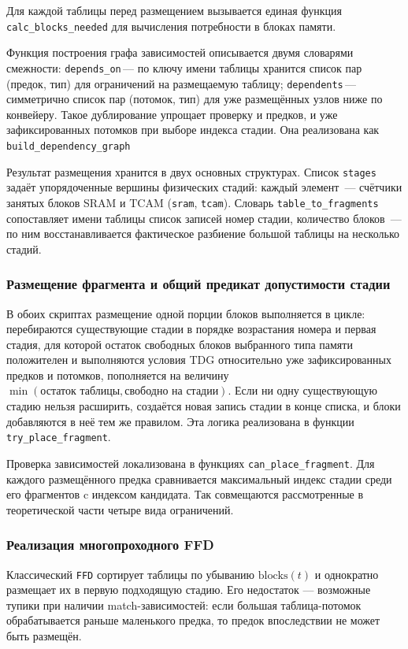 Для каждой таблицы перед размещением вызывается единая функция \texttt{calc\_blocks\_needed} для вычисления потребности в блоках памяти.

Функция построения графа зависимостей описывается двумя словарями смежности: \texttt{depends\_on}\,--- по ключу имени таблицы хранится список пар (предок, тип) для ограничений на размещаемую таблицу; \texttt{dependents}\,--- симметрично список пар (потомок, тип) для уже размещённых узлов ниже по конвейеру. Такое дублирование упрощает проверку и предков, и уже зафиксированных потомков при выборе индекса стадии. Она реализована как \texttt{build\_dependency\_graph}

Результат размещения хранится в двух основных структурах. Список \texttt{stages} задаёт упорядоченные вершины физических стадий: каждый элемент~--- счётчики занятых блоков SRAM и TCAM (\texttt{sram}, \texttt{tcam}). Словарь \texttt{table\_to\_fragments} сопоставляет имени таблицы список записей {номер стадии, количество блоков}~--- по ним восстанавливается фактическое разбиение большой таблицы на несколько стадий.

\subsubsection{Размещение фрагмента и общий предикат допустимости стадии}
В обоих скриптах размещение одной порции блоков выполняется в цикле: перебираются существующие стадии в порядке возрастания номера и первая стадия, для которой остаток свободных блоков выбранного типа памяти положителен и выполняются условия TDG относительно уже зафиксированных предков и потомков, пополняется на величину \(\min(\text{остаток таблицы}, \text{свободно на стадии})\). Если ни одну существующую стадию нельзя расширить, создаётся новая запись стадии в конце списка, и блоки добавляются в неё тем же правилом. Эта логика реализована в функции \texttt{try\_place\_fragment}.

Проверка зависимостей локализована в функциях \texttt{can\_place\_fragment}. Для каждого размещённого предка сравнивается максимальный индекс стадии среди его фрагментов c индексом кандидата. Так совмещаются рассмотренные в теоретической части четыре вида ограничений.

\subsubsection{Реализация многопроходного FFD}
Классический \texttt{FFD} сортирует таблицы по убыванию $\text{blocks}(t)$ и однократно размещает их в первую подходящую стадию. Его недостаток — возможные тупики при наличии match-зависимостей: если большая таблица-потомок обрабатывается раньше маленького предка, то предок впоследствии не может быть размещён.  

